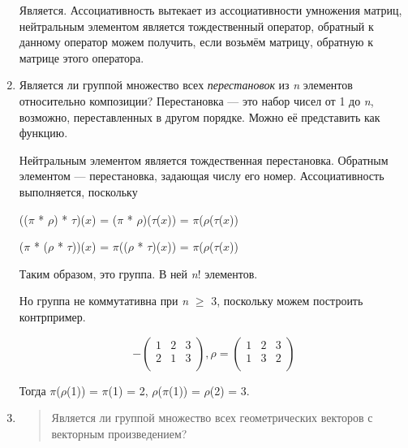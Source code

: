 \documentclass[12pt]{article}
\begin{document}
\begin{enumerate}
              Является. Ассоциативность вытекает из ассоциативности умножения матриц,
              нейтральным элементом является тождественный оператор, обратный к
              данному оператор можем получить, если возьмём матрицу, обратную к
              матрице этого оператора.

        \item
              Является ли группой множество всех \emph{перестановок} из \emph{n}
              элементов относительно композиции? Перестановка --- это набор чисел от
              1 до \emph{n}, возможно, переставленных в другом порядке. Можно её
              представить как функцию.

              Нейтральным элементом является тождественная перестановка. Обратным
              элементом --- перестановка, задающая числу его номер. Ассоциативность
              выполняется, поскольку

              (($\pi$ * $\rho$) * $\tau$)($x$) = ($\pi$ * $\rho$)($\tau$($x$)) = $\pi$($\rho$($\tau$($x$))

              ($\pi$ * ($\rho$ * $\tau$))($x$) = $\pi$(($\rho$ * $\tau$)($x$)) = $\pi$($\rho$($\tau$($x$))

              Таким образом, это группа. В ней \emph{n}! элементов.

              Но группа не коммутативна при \emph{n} $\geq$ 3, поскольку можем построить
              контрпример.

              \[- \begin{pmatrix}
                      1 & 2 & 3 \\
                      2 & 1 & 3 \\
                  \end{pmatrix},\rho = (\begin{matrix}
                      1 & 2 & 3 \\
                      1 & 3 & 2 \\
                  \end{matrix})\]

              Тогда $\pi$($\rho$(1)) = $\pi$(1) = 2, $\rho$($\pi$(1)) = $\rho$(2) = 3.

        \item
              \begin{quote}
                  Является ли группой множество всех геометрических векторов с векторным
                  произведением?
              \end{quote}


\end{enumerate}
\end{document}
